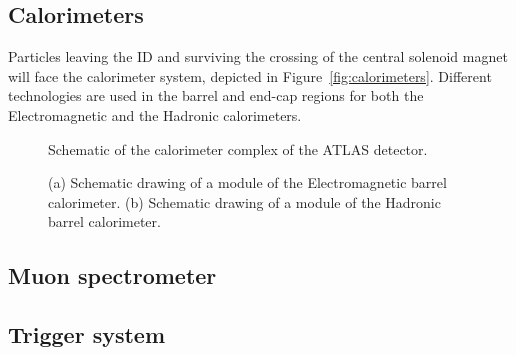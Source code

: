 \subsection{Calorimeters}\label{sec:calo}

Particles leaving the ID and surviving the crossing of the central solenoid magnet
will face the calorimeter system, depicted in Figure~\ref{fig:calorimeters}.
Different technologies are used in the barrel and end-cap regions for both the
Electromagnetic and the Hadronic calorimeters.

\begin{figure}[tb]\begin{center}
	\caption{Schematic of the calorimeter complex of the ATLAS detector.}
\end{center}\end{figure}

\begin{figure}[tb]\begin{center}
	\caption{(a) Schematic drawing of a module of the Electromagnetic barrel calorimeter. 
        (b) Schematic drawing of a module of the Hadronic barrel calorimeter.}
\end{center}\end{figure}


\subsection{Muon spectrometer}\label{sec:muonspec}

\subsection{Trigger system}\label{sec:trigger}

